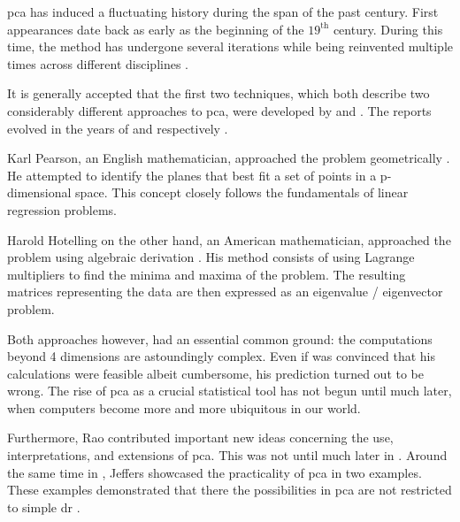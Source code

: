 \Gls{pca} has induced a fluctuating history during the span of the past century.
First appearances date back as early as the beginning of the $19^{\text{th}}$ century. 
During this time, the method has undergone several iterations while being reinvented multiple times across different disciplines \cite{jolliffe2016principal}.\bigskip


It is generally accepted that the first two techniques, which both describe two considerably different approaches to \gls{pca}, were developed by \citeauthor{pearson1901liii} and \citeauthor{hotelling1933analysis}. 
The reports evolved in the years of \citeyear{pearson1901liii} and \citeyear{hotelling1933analysis} respectively \cite{Jolliffe2002book}.

Karl Pearson, an English mathematician, approached the problem geometrically \cite{pearson1901liii}.
He attempted to identify the planes that best fit a set of points in a p-dimensional space.
This concept closely follows the fundamentals of linear regression problems.

Harold Hotelling on the other hand, an American mathematician, approached the problem using algebraic derivation \cite{hotelling1933analysis}.
His method consists of using Lagrange multipliers to find the minima and maxima of the problem.
The resulting matrices representing the data are then expressed as an eigenvalue / eigenvector problem.\medskip


Both approaches however, had an essential common ground: the computations beyond 4 dimensions are astoundingly complex.
Even if \citeauthor{pearson1901liii} was convinced that his calculations were feasible albeit cumbersome, his prediction turned out to be wrong.
The rise of \gls{pca} as a crucial statistical tool has not begun until much later, when computers become more and more ubiquitous in our world.\bigskip


Furthermore, Rao \cite{rao1964use} contributed important new ideas concerning the use, interpretations, and extensions of \gls{pca}.
This was not until much later in \citeyear{rao1964use}.
Around the same time in \citeyear{jeffers1967two}, Jeffers \cite{jeffers1967two} showcased the practicality of \gls{pca} in two examples. 
These examples demonstrated that there the possibilities in \gls{pca} are not restricted to simple \acrlong{dr} \cite{Jolliffe2002book}.



